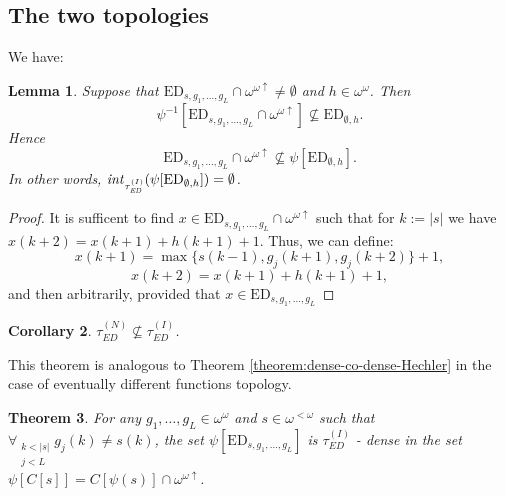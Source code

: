 \documentclass[12pt]{amsart}
\theoremstyle{plain}
\newtheorem{theorem}{Theorem}[section]
\newtheorem{lemma}[theorem]{Lemma}
\newtheorem{corollary}[theorem]{Corollary}
\theoremstyle{definition}
\theoremstyle{remark}
\newcommand{\baire}{\omega^{\omega}}
\newcommand{\finbaire}{\omega^{<\omega}}
\newcommand{\incrbaire}{\omega^{\omega \uparrow}}
\newcommand{\inversepsi}{\psi^{-1}}
\newcommand{\EventuallyDifferent}[2]{\mathrm{ED}_{#1,#2}}
\newcommand{\EventuallyDifferentNative}{\tau_{\mathit{ED}}^{(N)}}
\newcommand{\EventuallyDifferentInduced}{\tau_{\mathit{ED}}^{(I)}}
\newcommand{\ffid}{\inversepsi}
\begin{document}
\subsection{The two topologies}
We have:
\begin{lemma}
Suppose that 
$\EventuallyDifferent{s}{g_1, \ldots, g_L} \cap \incrbaire \not= \emptyset$
and $h \in \baire$. Then 
\[\ffid[\EventuallyDifferent{s}{g_1, \ldots, g_L} \cap \incrbaire] \not\subseteq
\EventuallyDifferent{\emptyset}{h}.\]
Hence 
\[\EventuallyDifferent{s}{g_1, \ldots, g_L} \cap \incrbaire \not\subseteq
  \psi[\EventuallyDifferent{\emptyset}{h}].\]
In other words,
${\it int}_{\EventuallyDifferentInduced}(\psi[\EventuallyDifferent{\emptyset}{h}]) = \emptyset$.
\end{lemma}
\begin{proof}
  It is sufficent to find
  $x \in \EventuallyDifferent{s}{g_1, \ldots, g_L} \cap \incrbaire$ such that
  for $k := |s|$ we have
  $x(k + 2) = x(k + 1) + h(k + 1) + 1$.
  Thus, we can define:
  \[
    x(k + 1) = \max \lbrace s(k - 1), g_j(k + 1), g_j(k + 2)\rbrace + 1,
  \]
  \[
    x(k + 2) = x(k + 1) + h(k + 1) + 1,
  \]
  and then arbitrarily, provided that
  $x \in \EventuallyDifferent{s}{g_1, \ldots, g_L}$
\end{proof}
\begin{corollary}
 $\EventuallyDifferentNative \not\subseteq \EventuallyDifferentInduced$.
\end{corollary}

This theorem is analogous to Theorem \ref{theorem:dense-co-dense-Hechler}
in the case of eventually different functions topology.

\begin{theorem}\label{theorem:dense-co-dense-ED}
  For any $g_1, \ldots, g_L \in \baire$ and $s\in\finbaire$
  such that $\forall_{\substack{k < |s| \\ j < L}} g_j(k) \not= s(k)$,
  the set
  $\psi[\EventuallyDifferent{s}{g_1, \ldots, g_L}]$ is
  $\EventuallyDifferentInduced$ - dense in the set
  $\psi[C[s]] = C[\psi(s)] \cap \incrbaire$.
\end{theorem}
\end{document}
